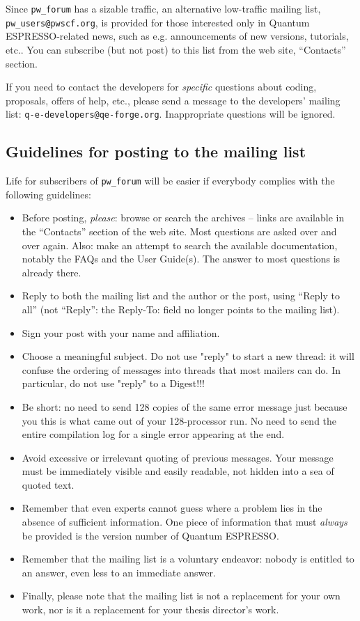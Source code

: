 \documentclass[12pt,a4paper]{article}
\def\qe{{\sc Quantum ESPRESSO}}
\begin{document}
Since \texttt{pw\_forum} has a sizable traffic, an alternative
low-traffic mailing list, \texttt{pw\_users@pwscf.org}, is provided for
those interested only in \qe-related news, such as e.g. announcements 
of new versions, tutorials, etc.. You can subscribe (but not post) to 
this list from the web site, ``Contacts'' section.

If you need to contact the developers for {\em specific} questions 
about coding, proposals, offers of help, etc., please send a message
to the developers' mailing list: \texttt{q-e-developers@qe-forge.org}.
Inappropriate questions will be ignored.

\subsection{Guidelines for posting to the mailing list}
\label{SubSec:Guidelines}
Life for subscribers of \texttt{pw\_forum} will be easier if everybody 
complies with the following guidelines:
\begin{itemize}
\item Before posting, {\em please}: browse or search the archives -- 
  links are available in the ``Contacts'' section  of the   web site.
  Most questions are asked over and over again. Also: make an attempt
  to search the
  available documentation, notably the FAQs and the User Guide(s).
  The answer to most questions is already there.
\item Reply to both the mailing list and the author or the post, using 
  ``Reply to all'' (not ``Reply'': the Reply-To: field no longer points
   to the mailing list).
\item Sign your post with your name and affiliation.
\item Choose a meaningful subject. Do not use "reply" to start a new
  thread:
  it will confuse the ordering of messages into threads that most mailers
  can do. In particular, do not use "reply" to a Digest!!!
\item Be short: no need to send 128 copies of the same error message just
  because you this is what came out of your 128-processor run. No need to
  send the entire compilation log for a single error appearing at the end.
\item Avoid excessive or irrelevant quoting of previous messages. Your
  message must be immediately visible and easily readable, not hidden
  into a sea of quoted text.
\item Remember that even experts cannot guess where a problem lies in
  the absence of sufficient information. One piece of information that
  must {\em always} be provided is the version number of \qe.
\item Remember that the mailing list is a voluntary endeavor: nobody is 
  entitled to an answer, even less to an immediate answer.
\item Finally, please note that the mailing list is not a replacement
  for your own work, nor is it a replacement for your thesis director's 
  work.
\end{itemize}
 
\end{document}
